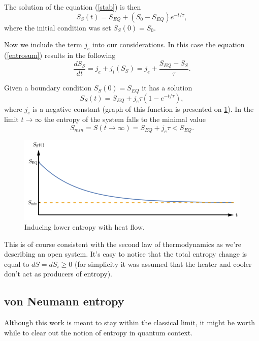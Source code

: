 \documentclass[a4paper,12pt]{article}
\begin{document}
The solution of the equation (\ref{stab}) is then
\begin{equation}
S_S(t) =S_{EQ}+(S_0-S_{EQ})e^{-t/\tau}, 
\end{equation}
where the initial condition was set $S_S(0)=S_0$.


Now we include the term $j_e$ into our considerations.
In this case the equation (\ref{entrosum}) results in the following 
\begin{equation}
\frac{dS_S}{dt}=j_e + j_i\left(S_S\right)=j_e +\frac{S_{EQ}-S_S}{\tau}.
\label{dSSdt}
\end{equation} 

 
Given a boundary condition $S_S(0) =S_{EQ}$ it has a solution
\begin{equation}
S_S(t)=S_{EQ}+j_e\tau \left(1-e^{-t/\tau }\right),
\end{equation} 
where $j_e$ is a negative constant (graph of this function is presented on \ref{Fig4}). 
In the limit $t\rightarrow \infty$ the entropy of the system falls to the minimal value
\begin{equation}
S_{min}=S(t\rightarrow \infty) =S_{EQ}+j_e \tau < S_{EQ}.
\end{equation}

\begin{figure}[ht!]
\centering \includegraphics[width=12cm]{wykres3} 
\caption{Inducing lower entropy with heat flow.}
\label{Fig4} 
\end{figure}

This is of course consistent with the second law of thermodynamics as we're describing an open system.
It's easy to notice that the total entropy change is equal to $dS=dS_i \geq 0$ (for simplicity it was assumed that the heater and cooler don't act as producers of entropy).

\subsection{von Neumann entropy}

Although this work is meant to stay within the classical limit, it might be worth while to clear out the notion of entropy in quantum context.
\end{document}
